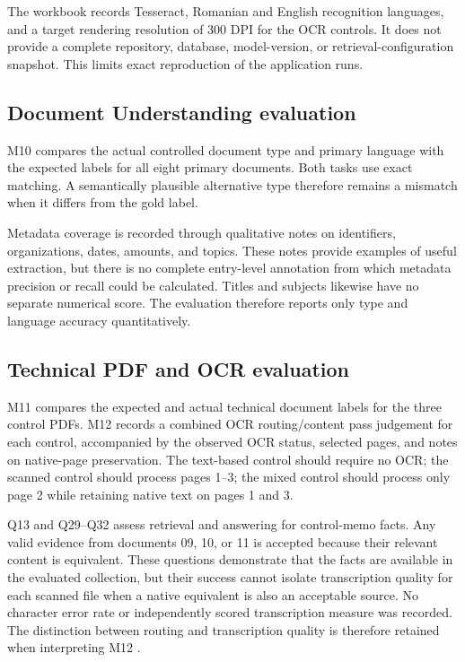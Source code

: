 The workbook records Tesseract, Romanian and English recognition languages, and a target rendering resolution of 300 DPI for the OCR controls. It does not provide a complete repository, database, model-version, or retrieval-configuration snapshot. This limits exact reproduction of the application runs.

\subsection{Document Understanding evaluation}

M10 compares the actual controlled document type and primary language with the expected labels for all eight primary documents. Both tasks use exact matching. A semantically plausible alternative type therefore remains a mismatch when it differs from the gold label.

Metadata coverage is recorded through qualitative notes on identifiers, organizations, dates, amounts, and topics. These notes provide examples of useful extraction, but there is no complete entry-level annotation from which metadata precision or recall could be calculated. Titles and subjects likewise have no separate numerical score. The evaluation therefore reports only type and language accuracy quantitatively.

\subsection{Technical PDF and OCR evaluation}

M11 compares the expected and actual technical document labels for the three control PDFs. M12 records a combined OCR routing/content pass judgement for each control, accompanied by the observed OCR status, selected pages, and notes on native-page preservation. The text-based control should require no OCR; the scanned control should process pages 1--3; the mixed control should process only page 2 while retaining native text on pages 1 and 3.

Q13 and Q29--Q32 assess retrieval and answering for control-memo facts. Any valid evidence from documents 09, 10, or 11 is accepted because their relevant content is equivalent. These questions demonstrate that the facts are available in the evaluated collection, but their success cannot isolate transcription quality for each scanned file when a native equivalent is also an acceptable source. No character error rate or independently scored transcription measure was recorded. The distinction between routing and transcription quality is therefore retained when interpreting M12 \cite{OCRDEvaluation}.

